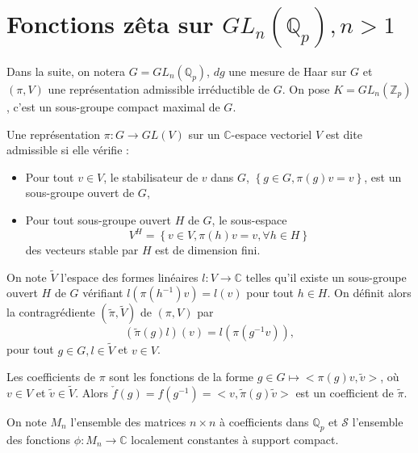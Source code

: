 \section{Fonctions zêta sur $GL_n(\mathbb{Q}_p), n > 1$}

\label{gln}
Dans la suite, on notera $G = GL_n(\mathbb{Q}_p)$, $dg$ une mesure de Haar sur $G$ et $(\pi, V)$ une représentation admissible irréductible de $G$. On pose $K=GL_n(\mathbb{Z}_p)$, c'est un sous-groupe compact maximal de $G$.

\begin{definition}
Une représentation $\pi : G \rightarrow GL(V)$ sur un $\mathbb{C}$-espace vectoriel $V$ est dite admissible si elle vérifie :
\begin{itemize}
\item Pour tout $v \in V$, le stabilisateur de $v$ dans $G$, $\left\lbrace g \in G, \pi(g)v = v \right\rbrace$, est un sous-groupe ouvert de $G$,
\item Pour tout sous-groupe ouvert $H$ de $G$, le sous-espace
\begin{equation*}
V^H=\left\lbrace v \in V, \pi(h)v = v, \forall h \in H \right\rbrace
\end{equation*}
des vecteurs stable par $H$ est de dimension fini.
\end{itemize}
\end{definition}

\begin{definition}
On note $\tilde{V}$ l'espace des formes linéaires $l : V \rightarrow \mathbb{C}$ telles qu'il existe un sous-groupe ouvert $H$ de $G$ vérifiant $l(\pi(h^{-1})v)=l(v)$ pour tout $h \in H$. On définit alors la contragrédiente $(\tilde{\pi}, \tilde{V})$ de $(\pi, V)$ par
\begin{equation}
(\tilde{\pi}(g)l)(v) = l(\pi(g^{-1}v)),
\end{equation}
pour tout $g \in G, l \in \tilde{V}$ et $v \in V$.
\end{definition}

Les coefficients de $\pi$ sont les fonctions de la forme $g \in G \mapsto <\pi(g)v, \tilde{v}>$, où $v \in V$ et $\tilde{v} \in \tilde{V}$. Alors $\check{f}(g)=f(g^{-1})=<v, \tilde{\pi}(g)\tilde{v}>$ est un coefficient de $\tilde{\pi}$.

On note $M_n$ l'ensemble des matrices $n \times n$ à coefficients dans $\mathbb{Q}_p$ et $\mathcal{S}$ l'ensemble des fonctions $\phi : M_n \rightarrow \mathbb{C}$ localement constantes à support compact.


